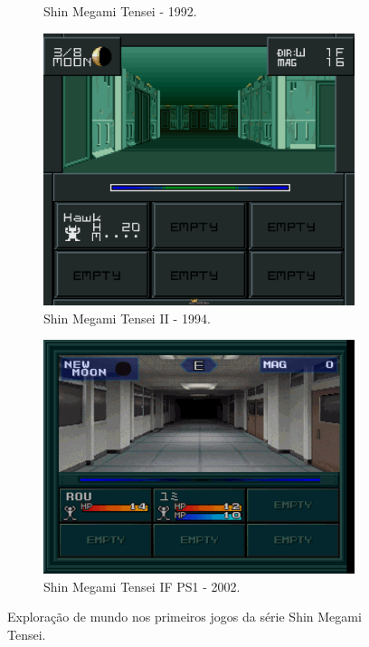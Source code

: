 \begin{figure}[h!]
\begin{subfigure}[b]{0.4\linewidth}
    \caption{Shin Megami Tensei - 1992.}
  \end{subfigure}
  \begin{subfigure}[b]{0.4\linewidth}
    \includegraphics[width=\linewidth]{smt2.jpg}
    \caption{Shin Megami Tensei II - 1994.}
  \end{subfigure}
  \begin{subfigure}[b]{0.4\linewidth}
    \includegraphics[width=\linewidth]{smtif.jpg}
    \caption{Shin Megami Tensei IF PS1 - 2002.}
  \end{subfigure}
  \caption{Exploração de mundo nos primeiros jogos da série Shin Megami Tensei.}
  \label{fig:smt}
\end{figure}

